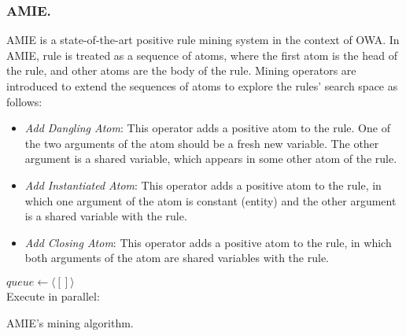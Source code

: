 \subsubsection{AMIE.}
AMIE \cite{amie} is a state-of-the-art positive rule mining system in the context of OWA. 
In AMIE, rule is treated as a sequence of atoms, where the first atom is the head of the rule, and other atoms are the body of the rule. Mining operators are introduced to extend the sequences of atoms to explore the rules' search space as follows:
\begin{itemize}
\item \textit{Add Dangling Atom}: This operator adds a positive atom to the rule. One of the two arguments of the atom should be a fresh new variable. The other argument is a shared variable, which appears in some other atom of the rule.
\item \textit{Add Instantiated Atom}: This operator adds a positive atom to the rule, in which one argument of the atom is constant (entity) and the other argument is a shared variable with the rule.
\item \textit{Add Closing Atom}: This operator adds a positive atom to the rule, in which both arguments of the atom are shared variables with the rule.
\end{itemize}
\begin{algorithm}[t]
\DontPrintSemicolon
$queue\leftarrow \langle[]\rangle$\\
Execute in parallel:\\
\caption{AMIE's mining algorithm.}
\label{algor:amie}
\end{algorithm}

